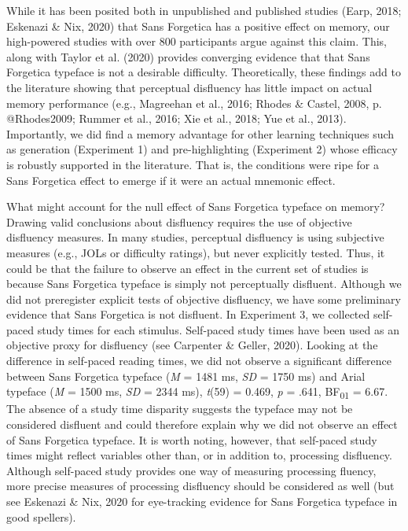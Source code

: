 \documentclass[
  english,
  jou]{apa6}
\begin{document}
While it has been posited both in unpublished and published studies (Earp, 2018; Eskenazi \& Nix, 2020) that Sans Forgetica has a positive effect on memory, our high-powered studies with over 800 participants argue against this claim. This, along with Taylor et al. (2020) provides converging evidence that that Sans Forgetica typeface is not a desirable difficulty. Theoretically, these findings add to the literature showing that perceptual disfluency has little impact on actual memory performance (e.g., Magreehan et al., 2016; Rhodes \& Castel, 2008, p. @Rhodes2009; Rummer et al., 2016; Xie et al., 2018; Yue et al., 2013). Importantly, we did find a memory advantage for other learning techniques such as generation (Experiment 1) and pre-highlighting (Experiment 2) whose efficacy is robustly supported in the literature. That is, the conditions were ripe for a Sans Forgetica effect to emerge if it were an actual mnemonic effect.

What might account for the null effect of Sans Forgetica typeface on memory? Drawing valid conclusions about disfluency requires the use of objective disfluency measures. In many studies, perceptual disfluency is using subjective measures (e.g., JOLs or difficulty ratings), but never explicitly tested. Thus, it could be that the failure to observe an effect in the current set of studies is because Sans Forgetica typeface is simply not perceptually disfluent. Although we did not preregister explicit tests of objective disfluency, we have some preliminary evidence that Sans Forgetica is not disfluent. In Experiment 3, we collected self-paced study times for each stimulus. Self-paced study times have been used as an objective proxy for disfluency (see Carpenter \& Geller, 2020). Looking at the difference in self-paced reading times, we did not observe a significant difference between Sans Forgetica typeface (\emph{M} = 1481 ms, \emph{SD} = 1750 ms) and Arial typeface (\emph{M} = 1500 ms, \emph{SD} = 2344 ms), \emph{t}(59) = 0.469, \emph{p} = .641, BF\textsubscript{01} = 6.67. The absence of a study time disparity suggests the typeface may not be considered disfluent and could therefore explain why we did not observe an effect of Sans Forgetica typeface. It is worth noting, however, that self-paced study times might reflect variables other than, or in addition to, processing disfluency. Although self-paced study provides one way of measuring processing fluency, more precise measures of processing disfluency should be considered as well (but see Eskenazi \& Nix, 2020 for eye-tracking evidence for Sans Forgetica typeface in good spellers).
\end{document}
